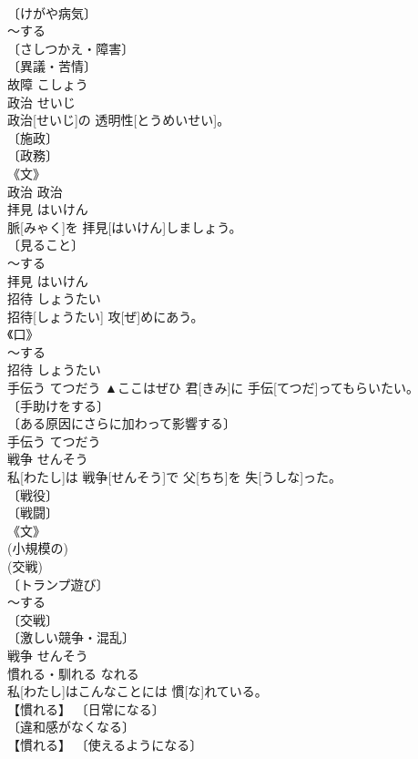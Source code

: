 \documentclass[8pt]{extreport}
\begin{document}
\begin{CJK}{UTF8}{min}
\\	〔けがや病気〕 
\\	～する 
\\	〔さしつかえ・障害〕 
\\	〔異議・苦情〕 
\\	故障	こしょう	
\\	政治	せいじ	
\\	政治[せいじ]の 透明性[とうめいせい]。	
\\	〔施政〕 
\\	〔政務〕 
\\	《文》 
\\	政治	政治	
\\	拝見	はいけん	
\\	脈[みゃく]を 拝見[はいけん]しましょう。	
\\	〔見ること〕 
\\	～する 
\\	拝見	はいけん	
\\	招待	しょうたい	
\\	招待[しょうたい] 攻[ぜ]めにあう。	
\\	《口》 
\\	～する 
\\	招待	しょうたい	
\\	手伝う	てつだう	▲ここはぜひ 君[きみ]に 手伝[てつだ]ってもらいたい。	
\\	〔手助けをする〕 
\\	〔ある原因にさらに加わって影響する〕 
\\	手伝う	てつだう	
\\	戦争	せんそう	
\\	私[わたし]は 戦争[せんそう]で 父[ちち]を 失[うしな]った。	
\\	〔戦役〕 
\\	〔戦闘〕 
\\	《文》 
\\	(小規模の) 
\\	(交戦) 
\\	〔トランプ遊び〕 
\\	～する 
\\	〔交戦〕 
\\	〔激しい競争・混乱〕 
\\	戦争	せんそう	
\\	慣れる・馴れる	なれる	
\\	私[わたし]はこんなことには 慣[な]れている。	
\\	【慣れる】 〔日常になる〕 
\\	〔違和感がなくなる〕 
\\	【慣れる】 〔使えるようになる〕 

\end{CJK}
\end{document}
